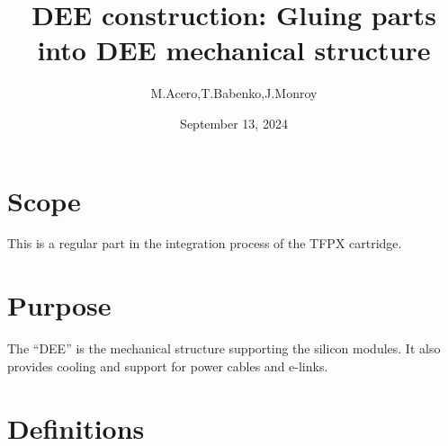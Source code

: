 \documentclass[12pt]{cornelltfpxsop}
\title{DEE construction: Gluing  parts into DEE mechanical structure}
\date{September 13, 2024}
\author{M.Acero,T.Babenko,J.Monroy}
\begin{document}
\maketitle
\section{Scope}
This is a regular part in the integration process of the TFPX cartridge.

\section{Purpose}
The ``DEE'' is the mechanical structure supporting the silicon modules. It also provides cooling and support for power cables and e-links.    

\section{Definitions}
\end{document}
